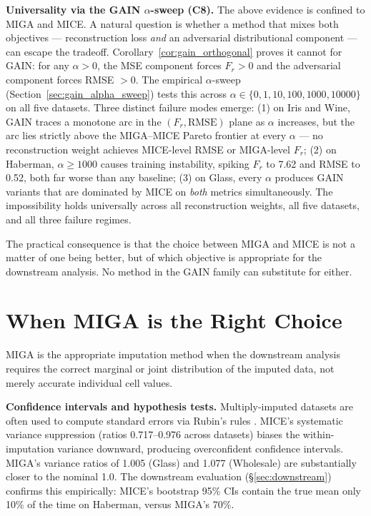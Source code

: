 \textbf{Universality via the GAIN $\alpha$-sweep (C8).} The above evidence is confined to MIGA and MICE. A natural question is whether a method that mixes both objectives --- reconstruction loss \emph{and} an adversarial distributional component --- can escape the tradeoff. Corollary~\ref{cor:gain_orthogonal} proves it cannot for GAIN: for any $\alpha > 0$, the MSE component forces $F_r > 0$ and the adversarial component forces RMSE $> 0$. The empirical $\alpha$-sweep (Section~\ref{sec:gain_alpha_sweep}) tests this across $\alpha \in \{0, 1, 10, 100, 1000, 10000\}$ on all five datasets. Three distinct failure modes emerge: (1) on Iris and Wine, GAIN traces a monotone arc in the $(F_r, \text{RMSE})$ plane as $\alpha$ increases, but the arc lies strictly above the MIGA--MICE Pareto frontier at every $\alpha$ --- no reconstruction weight achieves MICE-level RMSE or MIGA-level $F_r$; (2) on Haberman, $\alpha \geq 1000$ causes training instability, spiking $F_r$ to 7.62 and RMSE to 0.52, both far worse than any baseline; (3) on Glass, every $\alpha$ produces GAIN variants that are dominated by MICE on \emph{both} metrics simultaneously. The impossibility holds universally across all reconstruction weights, all five datasets, and all three failure regimes.

The practical consequence is that the choice between MIGA and MICE is not a matter of one being better, but of which objective is appropriate for the downstream analysis. No method in the GAIN family can substitute for either.


\section{When MIGA is the Right Choice}

MIGA is the appropriate imputation method when the downstream analysis requires the correct marginal or joint distribution of the imputed data, not merely accurate individual cell values.

\textbf{Confidence intervals and hypothesis tests.} Multiply-imputed datasets are often used to compute standard errors via Rubin's rules \cite{Rubin1987}. MICE's systematic variance suppression (ratios 0.717--0.976 across datasets) biases the within-imputation variance downward, producing overconfident confidence intervals. MIGA's variance ratios of 1.005 (Glass) and 1.077 (Wholesale) are substantially closer to the nominal 1.0. The downstream evaluation (§\ref{sec:downstream}) confirms this empirically: MICE's bootstrap 95\% CIs contain the true mean only 10\% of the time on Haberman, versus MIGA's 70\%.

